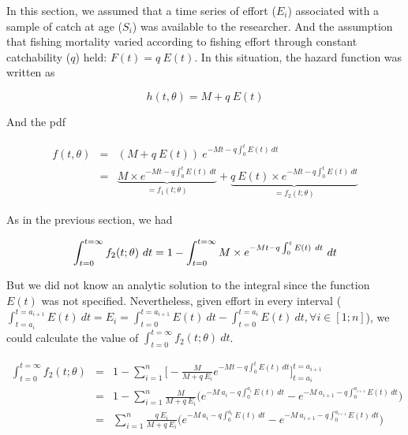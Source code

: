 In this section, we assumed that a time series of effort ($E_{i}$) associated with a sample of catch at age ($S_{i}$) was available to the researcher. And the assumption that fishing mortality varied according to fishing effort through constant catchability ($q$) held: $F(t) = q \ E(t)$. In this situation, the hazard function was written as

\begin{equation}
h(t,\theta) = M + q \ E(t)
\end{equation} 

And the pdf

\begin{eqnarray}
f(t, \theta) &=& ( M + q \ E(t)) \ e^{-Mt-q\int_{0}^{t}E(t) \ dt} \\
             &=& \underbrace{M \times e^{-Mt-q\int_{0}^{t}E(t) \ dt}}_{=f_{1}(t; \theta)} + \underbrace{q \ E(t) \times e^{-Mt-q\int_{0}^{t}E(t) \ dt}}_{=f_{2}(t; \theta)}
\end{eqnarray}

As in the previous section, we had

\begin{equation}
\int_{t=0}^{t=\infty} f_{2}(t; \theta) \ dt = 1 - \int_{t=0}^{t=\infty} M \times e^{-Mt-q\int_{0}^{t}E(t) \ dt} \ dt \\
\end{equation}

But we did not know an analytic solution to the integral since the function $E(t)$ was not specified. Nevertheless, given effort in every interval ($\int_{t=a_{i}}^{t=a_{i+1}}  E(t) \ dt = E_{i} = \int_{t=0}^{t=a_{i+1}} E(t) \ dt - \int_{t=0}^{t=a_{i}} E(t) \ dt, \forall i \in [1; n]$), we could calculate the value of $\int_{t=0}^{t=\infty} f_{2}(t; \theta) \ dt$. %

\begin{eqnarray}
\int_{t=0}^{t=\infty} f_{2}(t; \theta) &=& 1 - \sum_{i=1}^{n} \bigl [ -\frac{M}{M+q \ E_{i}} e^{-Mt-q\int_{0}^{t}E(t) \ dt} \bigr ]_{t=a_{i}}^{t=a_{i+1}} \\
                                   &=& 1 - \sum_{i=1}^{n} \frac{M}{M+q \ E_{i}} \bigl ( e^{-M \ a_{i}-q \int_{0}^{a_{i}}E(t) \ dt} - e^{-M \ a_{i+1}-q \int_{0}^{a_{i+1}} E(t) \ dt} \bigr ) \\
                                   &=& \sum_{i=1}^{n} \frac{q \ E_{i}}{M+q \ E_{i}} \bigl ( e^{-M \ a_{i}-q\int_{0}^{a_{i}}E(t) \ dt} - e^{-M \ a_{i+1}-q\int_{0}^{a_{i+1}}E(t) \ dt} \bigr ) \\
\end{eqnarray}

